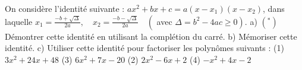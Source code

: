 \documentclass[a4paper,12pt]{report}
\begin{document}
On considère l'identité suivante : $a x^2+b x+c=a\left(x-x_1\right)\left(x-x_2\right)$, dans laquelle $x_1=\frac{-b+\sqrt{\Delta}}{2 a}, \quad x_2=\frac{-b-\sqrt{\Delta}}{2 a} \quad\left(\right.$ avec $\left.\Delta=b^2-4 a c \geq 0\right)$.
a) $\left(^*\right)$ Démontrer cette identité en utilisant la complétion du carré.
b) Mémoriser cette identité.
c) Utiliser cette identité pour factoriser les polynômes suivants :
(1) $3 x^2+24 x+48$
(3) $6 x^2+7 x-20$
(2) $2 x^2-6 x+2$
(4) $-x^2+4 x-2$
\end{document}
